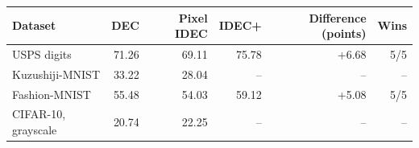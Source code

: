 \begin{tabular}{lrrrrr}\toprule
Dataset & DEC & Pixel IDEC & IDEC+ & Difference (points) & Wins\\\midrule
USPS digits & 71.26 & 69.11 & 75.78 & +6.68 & 5/5 \\
Kuzushiji-MNIST & 33.22 & 28.04 & -- & -- & -- \\
Fashion-MNIST & 55.48 & 54.03 & 59.12 & +5.08 & 5/5 \\
CIFAR-10, grayscale & 20.74 & 22.25 & -- & -- & -- \\
\bottomrule
\end{tabular}

